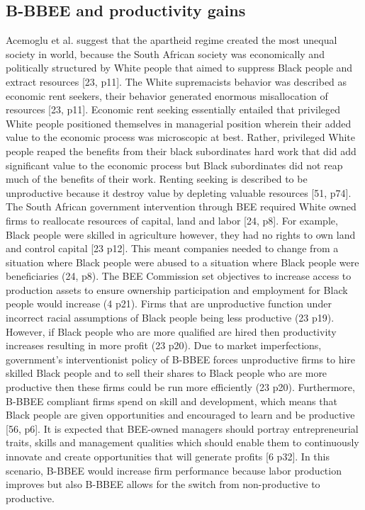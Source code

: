 \subsection{B-BBEE and productivity gains}
Acemoglu et al. suggest that the apartheid regime created the most unequal society in world, because the South African society was economically and politically structured by White people that aimed to suppress Black people and extract resources [23, p11]. The White supremacists behavior was described as economic rent seekers, their behavior generated enormous misallocation of resources [23, p11].  Economic rent seeking essentially entailed that privileged White people positioned themselves in managerial position wherein their added value to the economic process was microscopic at best. Rather, privileged White people reaped the benefits from their black subordinates hard work that did add significant value to the economic process but Black subordinates did not reap much of the benefits of their work. Renting seeking is described to be unproductive because it destroy value by depleting valuable resources [51, p74]. The South African government intervention through BEE required White owned firms to reallocate resources of capital, land and labor [24, p8]. For example, Black people were skilled in agriculture however, they had no rights to own land and control capital [23 p12]. This meant companies needed to change from a situation where Black people were abused to a situation where Black people were beneficiaries (24, p8). The BEE Commission set objectives to increase access to production assets to ensure ownership participation and employment for Black people would increase (4 p21). Firms that are unproductive function under incorrect racial assumptions of Black people being less productive (23 p19). However, if Black people who are more qualified are hired then productivity increases resulting in more profit (23 p20). Due to market imperfections, government's interventionist policy of B-BBEE forces unproductive firms to hire skilled Black people and to sell their shares to Black people who are more productive then these firms could be run more efficiently (23 p20). Furthermore, B-BBEE compliant firms spend on skill and development, which means that Black people are given opportunities and encouraged to learn and be productive [56, p6]. It is expected that BEE-owned managers should portray entrepreneurial traits, skills and management qualities which should enable them to continuously innovate and create opportunities that will generate profits [6 p32]. In this scenario, B-BBEE would increase firm performance because labor production improves but also B-BBEE allows for the switch from non-productive to productive.
